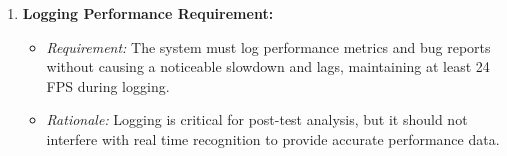 \begin{enumerate}
\begin{itemize}
                \end{itemize}
            \item \textbf{Logging Performance Requirement:}
                \begin{itemize}
                    \item \textit{Requirement:} The system must log performance metrics and bug reports without causing a noticeable slowdown and lags, maintaining at least 24 FPS during logging.
                    \item \textit{Rationale:} Logging is critical for post-test analysis, but it should not interfere with real time recognition to provide accurate performance data.
                \end{itemize}
        \end{enumerate}